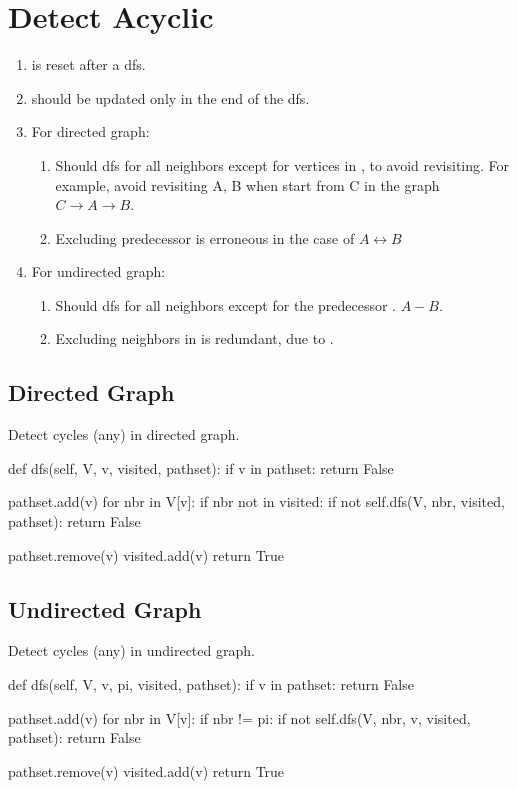 \section{Detect Acyclic}
\begin{enumerate}
\item {} is reset after a dfs.
\item {} should be updated only in the end of the dfs.
\item For directed graph:
\begin{enumerate}
\item Should dfs for all neighbors except for vertices in , to avoid revisiting. For example, avoid revisiting A, B when start from C in the graph $C \rightarrow A \rightarrow B$.
\item Excluding predecessor  is erroneous in the case of $A \leftrightarrow B$
\end{enumerate}
\item For undirected graph:
\begin{enumerate}
\item Should dfs for all neighbors except for the predecessor . $A-B$.
\item Excluding neighbors in  is redundant, due to .
\end{enumerate}
\end{enumerate}

\subsection{Directed Graph}
Detect cycles (any) in directed graph.

\begin{python}
def dfs(self, V, v, visited, pathset):
  if v in pathset:
    return False

  pathset.add(v)
  for nbr in V[v]:
    if nbr not in visited:
      if not self.dfs(V, nbr, visited, pathset):
        return False

  pathset.remove(v)
  visited.add(v)
  return True
\end{python}


\subsection{Undirected Graph}
Detect cycles (any) in undirected graph.

\begin{python}
def dfs(self, V, v, pi, visited, pathset):
  if v in pathset:
    return False

  pathset.add(v)
  for nbr in V[v]:
    if nbr != pi:
      if not self.dfs(V, nbr, v, visited, pathset):
        return False

  pathset.remove(v)
  visited.add(v)
  return True
\end{python}

